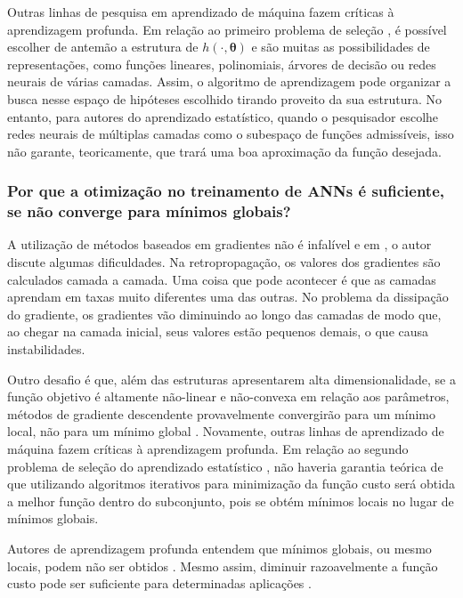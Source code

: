 Outras linhas de pesquisa em aprendizado de máquina fazem críticas à aprendizagem profunda. Em relação ao primeiro problema de seleção \cite{Vapnik2019}, é possível escolher de antemão a estrutura de $h( \cdot , \bm{\theta})$ e são muitas as possibilidades de representações, como funções lineares, polinomiais, árvores de decisão ou redes neurais de várias camadas. Assim, o algoritmo de aprendizagem pode organizar a busca nesse espaço de hipóteses escolhido tirando proveito da sua estrutura. No entanto, para autores do aprendizado estatístico, quando o pesquisador escolhe redes neurais de múltiplas camadas como o subespaço de funções admissíveis, isso não garante, teoricamente, que trará uma boa aproximação da função desejada. 


\subsubsection{Por que a otimização no treinamento de ANNs  é suficiente, se não converge para mínimos globais?}\label{sec:otimi2}

A utilização de métodos baseados em gradientes não é infalível e em \cite[pág. 159]{nielsen2018}, o autor discute algumas dificuldades. Na retropropagação, os valores dos gradientes são calculados camada a camada. Uma coisa que pode acontecer é que as camadas aprendam em taxas muito diferentes uma das outras. No problema da dissipação do gradiente, os gradientes vão diminuindo ao longo das camadas de modo que, ao chegar na camada inicial, seus valores estão pequenos demais, o que causa instabilidades.

Outro desafio é que, além das estruturas apresentarem alta dimensionalidade, se a função objetivo é altamente não-linear e não-convexa em relação aos parâmetros, métodos de gradiente descendente provavelmente convergirão para um mínimo local, não para um mínimo global \cite{Adler2021}. Novamente, outras linhas de aprendizado de máquina fazem críticas à aprendizagem profunda. Em relação ao segundo problema de seleção do aprendizado estatístico \cite{Vapnik2019}, não haveria garantia teórica de que utilizando algoritmos iterativos para minimização da função custo será obtida a melhor função dentro do subconjunto, pois se obtém mínimos locais no lugar de mínimos globais.


Autores de aprendizagem profunda entendem que mínimos globais, ou mesmo locais, podem não ser obtidos \cite[págs. 192, 285]{goodfellow2016deep}. Mesmo assim, diminuir razoavelmente a função custo pode ser suficiente para determinadas aplicações \cite[págs. 23-6]{goodfellow2016deep}.

